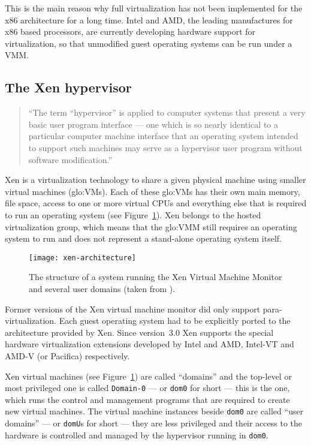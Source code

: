 This is the  main reason why full virtualization  has not been implemented
for  the x86  architecture for  a long  time. Intel  and AMD,  the leading
manufactures for  x86 based processors, are  currently developing hardware
support for virtualization, so that unmodified guest operating systems can
be run under a VMM.

\subsection{The Xen hypervisor}
\label{sec:xen-hypervisor}

\begin{quote}
  ``The term “hypervisor” is applied to computer systems that present a very
basic user  program interface ---  one which is  so nearly identical  to a
particular computer machine interface that an operating system intended to
support  such machines  may serve  as  a hypervisor  user program  without
software modification.'' \cite{hendricks79}
\end{quote}

\medskip

Xen \cite{xen}  is a virtualization  technology to share a  given physical
machine  using smaller  virtual machines  (\gls{glo:VM}s).  Each  of these
\gls{glo:VM}s has their own main memory, file space, access to one or more
virtual  CPUs and everything  else that  is required  to run  an operating
system (see Figure~\ref{fig:xen-architecture}).  Xen belongs to the hosted
virtualization group, which means that the \gls{glo:VMM} still requires an
operating system  to run  and does not  represent a  stand-alone operating
system itself.

\begin{figure}[ht]
  \centering
  \texttt{[image: xen-architecture]}
  \caption[Xen  architecture]{The structure  of a  system running  the Xen
    Virtual  Machine   Monitor  and  several  user   domains  (taken  from
    \cite{xen-art}).}
  \label{fig:xen-architecture}
\end{figure}

Former  versions of  the  Xen  virtual machine  monitor  did only  support
para-virtualization.   Each guest  operating system  had to  be explicitly
ported  to the  architecture  provided by  Xen.   Since version~$3.0$  Xen
supports the special hardware virtualization extensions developed by Intel
and AMD, Intel-VT and AMD-V (or Pacifica) respectively.

Xen  virtual machines  (see Figure~\ref{fig:xen-architecture})  are called
``domains''  and   the  top-level  or   most  privileged  one   is  called
\texttt{Domain-0}  --- or  \texttt{dom0} for  short ---  this is  the one,
which runs the control and management programs that are required to create
new virtual machines.  The  virtual machine instances beside \texttt{dom0}
are called ``user  domains'' --- or \texttt{domU}s for  short --- they are
less privileged and their access to the hardware is controlled and managed
by the hypervisor running in \texttt{dom0}.

